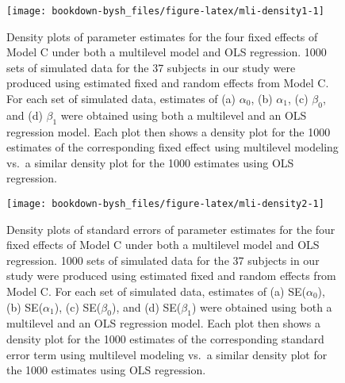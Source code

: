\documentclass[
]{krantz}
\begin{document}
\begin{figure}

{\centering \texttt{[image: bookdown-bysh\_files/figure-latex/mli-density1-1]} 

}

\caption{Density plots of parameter estimates for the four fixed effects of Model C under both a multilevel model and OLS regression. 1000 sets of simulated data for the 37 subjects in our study were produced using estimated fixed and random effects from Model C. For each set of simulated data, estimates of (a) \(\alpha_{0}\), (b) \(\alpha_{1}\), (c) \(\beta_{0}\), and (d) \(\beta_{1}\) were obtained using both a multilevel and an OLS regression model. Each plot then shows a density plot for the 1000 estimates of the corresponding fixed effect using multilevel modeling vs.~a similar density plot for the 1000 estimates using OLS regression.}\label{fig:mli-density1}
\end{figure}



\begin{figure}

{\centering \texttt{[image: bookdown-bysh\_files/figure-latex/mli-density2-1]} 

}

\caption{Density plots of standard errors of parameter estimates for the four fixed effects of Model C under both a multilevel model and OLS regression. 1000 sets of simulated data for the 37 subjects in our study were produced using estimated fixed and random effects from Model C. For each set of simulated data, estimates of (a) SE(\(\alpha_{0}\)), (b) SE(\(\alpha_{1}\)), (c) SE(\(\beta_{0}\)), and (d) SE(\(\beta_{1}\)) were obtained using both a multilevel and an OLS regression model. Each plot then shows a density plot for the 1000 estimates of the corresponding standard error term using multilevel modeling vs.~a similar density plot for the 1000 estimates using OLS regression.}\label{fig:mli-density2}
\end{figure}
\end{document}
